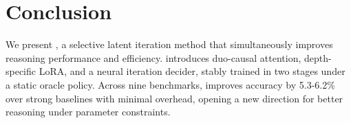 \section{Conclusion}
\label{sec:conclusion}
We present \name, a selective latent iteration method that simultaneously improves reasoning performance and efficiency.
\name introduces duo-causal attention, depth-specific LoRA, and a neural iteration decider, stably trained in two stages under a static oracle policy.
Across nine benchmarks, \name improves accuracy by 5.3-6.2\% over strong baselines with minimal overhead, opening a new direction for better reasoning under parameter constraints.